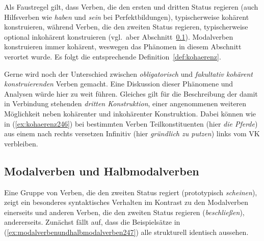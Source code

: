 Als Faustregel gilt, dass Verben, die den ersten und dritten Status regieren (\zB auch Hilfsverben wie \textit{haben} und \textit{sein} bei Perfektbildungen), typischerweise kohärent konstruieren, während Verben, die den zweiten Status regieren, typischerweise optional inkohärent konstruieren (vgl.\ aber \zB Abschnitt~\ref{sec:modalverbenundhalbmodalverben}).
Modalverben konstruieren immer kohärent, weswegen das Phänomen in diesem Abschnitt verortet wurde.
Es folgt die entsprechende Definition~\ref{def:kohaerenz}.


Gerne wird noch der Unterschied zwischen \textit{obligatorisch} und \textit{fakultativ kohärent konstruierenden} Verben gemacht.
Eine Diskussion dieser Phänomene und Analysen würde hier zu weit führen.
Gleiches gilt für die Beschreibung der damit in Verbindung stehenden \textit{dritten Konstruktion}, einer angenommenen weiteren Möglichkeit neben kohärenter und inkohärenter Konstruktion.
Dabei können wie in (\ref{ex:kohaerenz246}) bei bestimmten Verben Teilkonstituenten (hier \textit{die Pferde}) aus einem nach rechts versetzen Infinitiv (hier \textit{gründlich zu putzen}) links vom VK verbleiben.

\begin{exe}
\end{exe}

\subsection{Modalverben und Halbmodalverben}
\label{sec:modalverbenundhalbmodalverben}


Eine Gruppe von Verben, die den zweiten Status regiert (prototypisch \textit{scheinen}), zeigt ein besonderes syntaktisches Verhalten im Kontrast zu den Modalverben einerseits und anderen Verben, die den zweiten Status regieren (\zB \textit{beschließen}), andererseits.
Zunächst fällt auf, dass die Beispielsätze in (\ref{ex:modalverbenundhalbmodalverben247}) alle strukturell identisch aussehen.

